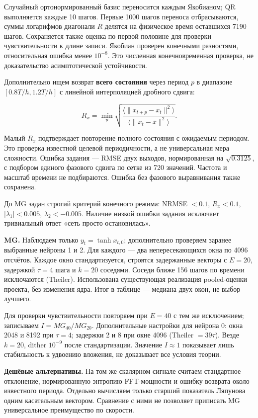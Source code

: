 \documentclass[10pt,a4paper]{article}
\begin{document}
Случайный ортонормированный базис переносится каждым Якобианом; QR выполняется каждые 10 шагов. Первые 1000 шагов переноса отбрасываются, суммы логарифмов диагонали $R$ делятся на физическое время оставшихся 7190 шагов. Сохраняется также оценка по первой половине для проверки чувствительности к длине записи. Якобиан проверен конечными разностями, относительная ошибка менее $10^{-8}$. Это численная конечновременная проверка, не доказательство асимптотической устойчивости.

Дополнительно ищем возврат \textbf{всего состояния} через период $p$ в диапазоне $[0.8T/h,1.2T/h]$ с линейной интерполяцией дробного сдвига:

\[
R_x=\min_p\sqrt{\frac{\langle\|x_{t+p}-x_t\|^2\rangle}
{\langle\|x_t-\bar x\|^2\rangle}}.
\]

Малый $R_x$ подтверждает повторение полного состояния с ожидаемым периодом. Это проверка известной целевой периодичности, а не универсальная мера сложности. Ошибка задания --- RMSE двух выходов, нормированная на $\sqrt{0.3125}$, с подбором единого фазового сдвига по сетке из 720 значений. Частота и масштаб времени не подбираются. Ошибка без фазового выравнивания также сохранена.

До MG задан строгий критерий конечного режима: NRMSE $<0.1$, $R_x<0.1$, $|\lambda_1|<0.005$, $\lambda_2<-0.005$. Наличие низкой ошибки задания исключает тривиальный ответ «сеть просто остановилась».

\textbf{MG.} Наблюдаем только $y_t=\tanh x_{t,0}$; дополнительно проверяем заранее выбранные нейроны 1 и 2. Для каждого --- два непересекающихся окна по 4096 отсчётов. Каждое окно стандартизуется, строятся задержанные векторы с $E=20$, задержкой $\tau=4$ шага и $k=20$ соседями. Соседи ближе 156 шагов по времени исключаются (Theiler). Использована существующая реализация pooled-оценки проекта, без изменения ядра. Итог в таблице --- медиана двух окон, не выбор лучшего.

Для проверки чувствительности повторяем при $E=40$ с тем же исключением; записываем $I=MG_{40}/MG_{20}$. Дополнительные настройки для нейрона 0: окна 2048 и 8192 при $\tau=4$; задержки 2 и 8 при окне 4096 (Theiler $=39\tau$). Везде $k=20$, dither $10^{-9}$ после стандартизации. Значение $I\approx1$ показывает лишь стабильность к удвоению вложения, не доказывает все условия теории.

\textbf{Дешёвые альтернативы.} На том же скалярном сигнале считаем стандартное отклонение, нормированную энтропию FFT-мощности и ошибку возврата около известного периода. Отдельно вычисляем только старший показатель Ляпунова одним касательным вектором. Сравнение с ними не позволяет приписать MG универсальное преимущество по скорости.
\end{document}
